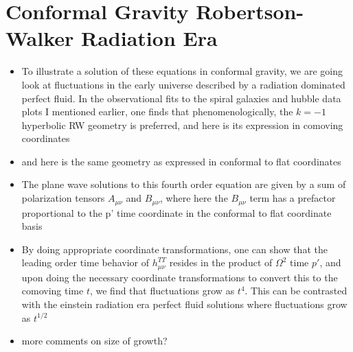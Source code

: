 \documentclass[10pt,letterpaper]{article}
\numberwithin{equation}{section}
\begin{document}

\section{Conformal Gravity Robertson-Walker Radiation Era}
\begin{itemize}
	\item To illustrate a solution of these equations in conformal gravity, we are going look at fluctuations in the early universe described by a radiation dominated perfect fluid. In the observational fits to the spiral galaxies and hubble data plots I mentioned earlier, one finds that phenomenologically, the $k=-1$ hyperbolic RW geometry is preferred, and here is its expression in comoving coordinates
	\item and here is the same geometry as expressed in conformal to flat coordinates
	\item The plane wave solutions to this fourth order equation are given by a sum of polarization tensors $A_{\mu\nu}$ and $B_{\mu\nu}$, where here the $B_{\mu\nu}$ term has a prefactor proportional to the p' time coordinate in the conformal to flat coordinate basis
	\item By doing appropriate coordinate transformations, one can show that the leading order time behavior of $h_{\mu\nu}^{TT}$ resides in the product of $\Omega^2$ time $p'$, and upon doing the necessary coordinate transformations to convert this to the comoving time $t$, we find that fluctuations grow as $t^4$. This can be contrasted with the einstein radiation era perfect fluid solutions where fluctuations grow as $t^{1/2}$
	\item more comments on size of growth? 
\end{itemize}

\end{document}
